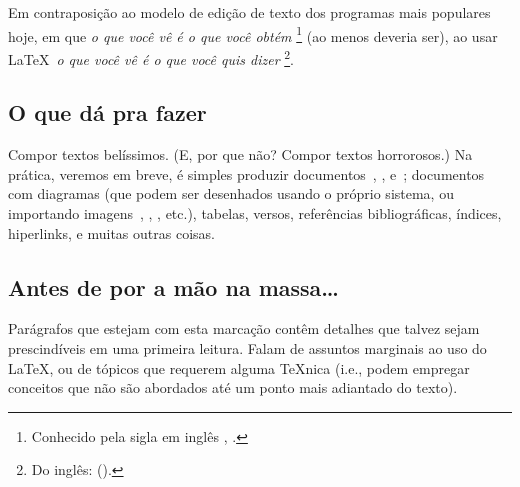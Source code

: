 Em contraposição ao modelo de edição de texto dos programas mais
populares hoje, em que 
\emph{o que você vê é o que você obtém}%
\footnote{Conhecido pela sigla em inglês \acronimo{\acronimowysiwyg},
  \emph{\wysiwyg}.} (ao menos deveria ser), ao usar
\LaTeX\ \emph{o que você vê é o que você quis dizer}%
\footnote{Do inglês: \emph{\wysiwym} (\acronimo{\acronimowysiwym}).}.



\subsection{O que dá pra fazer}

Compor textos belíssimos. (E, por que não? Compor textos horrorosos.) Na
prática, veremos em breve, é simples produzir
documentos~, , e~; documentos
com diagramas (que podem ser desenhados usando o próprio sistema, ou
importando imagens~, , ,
etc.), tabelas, versos, referências bibliográficas, índices,
hiperlinks, e muitas outras coisas.


\subsection{Antes de por a mão na massa\ldots}

\begin{detalhe}
Parágrafos que estejam com esta marcação contêm detalhes que talvez
sejam prescindíveis em uma primeira leitura. Falam de assuntos
marginais ao uso do \LaTeX, ou de tópicos que requerem alguma
\TeX nica (i.e., podem empregar conceitos que não são abordados até
um ponto mais adiantado do texto).
\end{detalhe}

